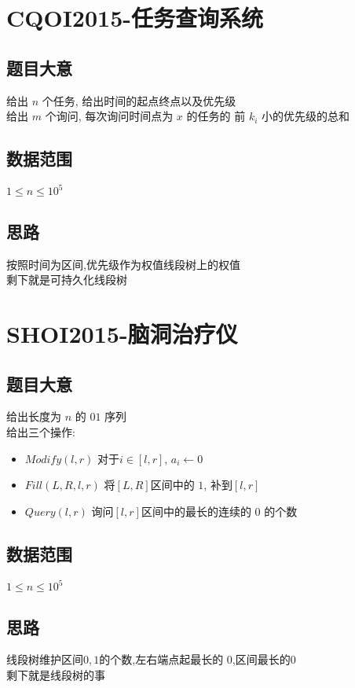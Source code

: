 \documentclass{ctexart}
\numberwithin{equation}{section}
\begin{document}
\begin{flushleft}
  \section{CQOI2015-任务查询系统}
  \subsection{题目大意}
  给出 $n$ 个任务, 给出时间的起点终点以及优先级\\
  给出 $m$ 个询问, 每次询问时间点为 $x$ 的任务的 前 $k_i$ 小的优先级的总和\\
  \subsection{数据范围}
  $1\le n\le10^5$\\
  \subsection{思路}
  按照时间为区间,优先级作为权值线段树上的权值\\
  剩下就是可持久化线段树\\
  \newpage

  \section{SHOI2015-脑洞治疗仪}
  \subsection{题目大意}
  给出长度为 $n$ 的 $01$ 序列\\
  给出三个操作:
  \begin{itemize}
  \item $Modify(l,r)$ 对于$i\in [l,r]$, $a_i \leftarrow 0$
  \item $Fill(L,R,l,r)$ 将$[L,R]$区间中的 $1$, 补到$[l,r]$
  \item $Query(l,r)$ 询问$[l,r]$区间中的最长的连续的 $0$ 的个数
  \end{itemize}
  \subsection{数据范围}
  $1\le n\le10^5$\\
  \subsection{思路}
  线段树维护区间$0,1$的个数,左右端点起最长的 $0$,区间最长的$0$ \\
  剩下就是线段树的事\\
  \newpage


\end{flushleft}
\end{document}
